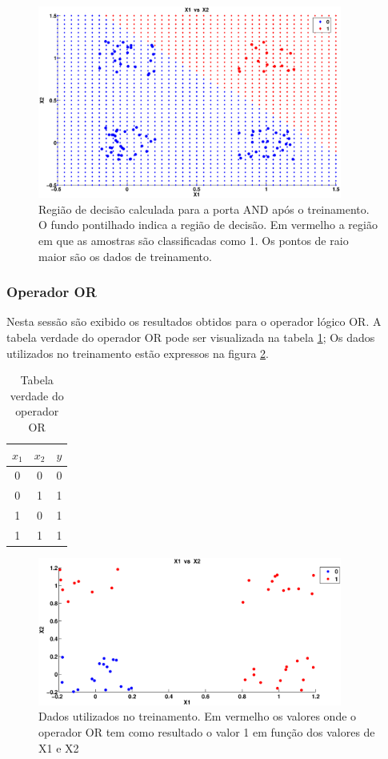 \documentclass[12pt,journal,onecolumn]{IEEEtran}
\begin{document}
\begin{figure}[!htbp]
	\centering
	\includegraphics[width=10cm, trim = 3cm 1cm 3cm 1cm, clip=true
	]{eps/and/ANDRegiao.eps}
	\caption{Região de decisão calculada para a porta AND após o treinamento. O
	fundo pontilhado indica a região de decisão. Em vermelho a região em que as
	amostras são classificadas como 1. Os pontos de raio maior são os dados de
	treinamento.}
	\label{fig:andReg}
\end{figure} 

\subsubsection{Operador OR}
Nesta sessão são exibido os resultados obtidos para o operador lógico OR.
A tabela verdade do operador OR pode ser visualizada na
tabela \ref{tab:verd_OR};
Os dados utilizados no treinamento estão expressos na figura \ref{fig:OR_dados}.

\begin{table}[!htbp]
\caption{Tabela verdade do operador OR}
\label{tab:verd_OR}
\centering
	\begin{tabular}{| c | c | c |}
		\hline
		 $x_1$  & $x_2$ 	& $y$ \\ \hline
		 0      & 0 		& 0 \\ \hline
		 0 		& 1 		& 1 \\ \hline
		 1 		& 0 		& 1 \\ \hline
		 1 		& 1 		& 1 \\
		\hline
	\end{tabular}
\end{table}



\begin{figure}[!htbp]
	\centering
	\includegraphics[width=10cm, trim = 3cm 1cm 3cm 1cm, clip=true
	]{eps/or/ORDesired.eps}
	\caption{Dados utilizados no treinamento. Em vermelho os valores onde o
	operador OR tem como resultado o valor 1 em função dos valores de X1 e X2}
	\label{fig:OR_dados}
\end{figure} 
\end{document}
